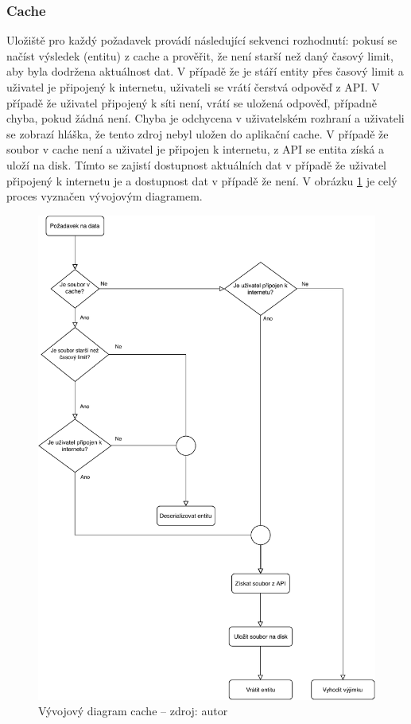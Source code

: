 \subsubsection{Cache}


Uložiště pro každý požadavek provádí následující sekvenci rozhodnutí: pokusí se načíst výsledek (entitu) z cache a prověřit, že není starší než daný časový limit, aby byla dodržena aktuálnost dat. V případě že je stáří entity přes časový limit a uživatel je připojený k internetu, uživateli se vrátí čerstvá odpověď z API. V případě že uživatel připojený k síti není, vrátí se uložená odpověď, případně chyba, pokud žádná není. Chyba je odchycena v uživatelském rozhraní a uživateli se zobrazí hláška, že tento zdroj nebyl uložen do aplikační cache. V případě že soubor v cache není a uživatel je připojen k internetu, z API se entita získá a uloží na disk. Tímto se zajistí dostupnost aktuálních dat v případě že uživatel připojený k internetu je a dostupnost dat v případě že není. V obrázku \ref{cachediagram} je celý proces vyznačen vývojovým diagramem.

\begin{figure}[H]
	\begin{center}
		\includegraphics[width=145mm]{img/cache.pdf}
	\end{center}
	\caption[Cache -- vývojový diagram]{Vývojový diagram cache -- zdroj: autor}
	\label{cachediagram}
\end{figure}


